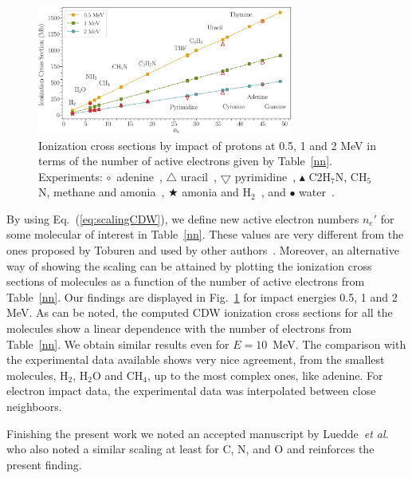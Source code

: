\documentclass[preprint]{revtex4-2}
\begin{document}
\begin{figure}[t!]
\centering
\includegraphics[width=0.75\textwidth]{figuras/scale_ne.eps}
\caption{Ionization cross sections by impact of protons at 0.5, 1 and 2 MeV
in terms of the number of active electrons given by Table~\ref{nn}.
Experiments: 
\mbox{\Large$\circ$}~adenine~\cite{iriki2011}, 
$\triangle$ uracil~\cite{itoh2013}, 
$\bigtriangledown$ pyrimidine~\cite{wolff2014}, 
$\blacktriangle$ C2H$_7$N, CH$_5$N, methane and amonia~\cite{lynch1976},
\mbox{\scriptsize$\bigstar$} amonia and H$_2$~\cite{rudd1985}, and 
\mbox{\Large$\bullet$} water~\cite{luna2007}.}
\label{fig:recta}
\end{figure}

By using Eq.~(\ref{eq:scalingCDW}), we define new active electron 
numbers $n_e'$ for some molecular of interest in Table~\ref{nn}. 
These values are very different from the ones proposed by Toburen and 
used by other authors~\cite{itoh2013}.
Moreover, an alternative way of showing the scaling can be attained by 
plotting the ionization cross sections of molecules as a function of the 
number of active electrons from Table~\ref{nn}. Our findings are displayed 
in Fig.~\ref{fig:recta} for impact energies 0.5, 1 and 2 MeV. As can be 
noted, the computed CDW ionization cross sections for all the molecules  
show a linear dependence with the number of electrons from Table~\ref{nn}. 
We obtain similar results even for $E=10$~MeV. The comparison with the 
experimental data available shows very nice agreement, from the smallest 
molecules, H$_2$, H$_2$O and CH$_4$, up to the most complex ones, like 
adenine. For electron impact data, the experimental data was interpolated
between close neighboors.

Finishing the present work we noted an accepted manuscript by 
Luedde~{\it et al.} \cite{luedde2019} who also noted a similar scaling 
at least for C, N, and O and reinforces the present finding.

\end{document}
